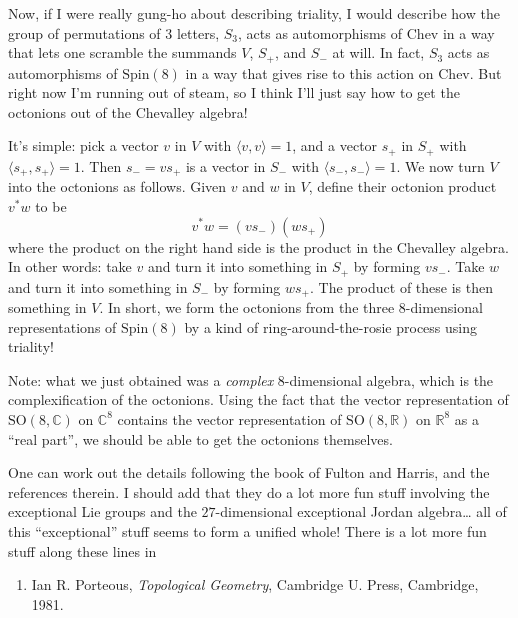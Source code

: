 \documentclass{article}
\def\tightlist{}
\begin{document}
Now, if I were really gung-ho about describing triality, I would
describe how the group of permutations of 3 letters, \(S_3\), acts as
automorphisms of \(\mathrm{Chev}\) in a way that lets one scramble the
summands \(V\), \(S_+\), and \(S_-\) at will. In fact, \(S_3\) acts as
automorphisms of \(\mathrm{Spin}(8)\) in a way that gives rise to this
action on \(\mathrm{Chev}\). But right now I'm running out of steam, so
I think I'll just say how to get the octonions out of the Chevalley
algebra!

It's simple: pick a vector \(v\) in \(V\) with
\(\langle v,v \rangle = 1\), and a vector \(s_+\) in \(S_+\) with
\(\langle s_+,s_+ \rangle = 1\). Then \(s_- = vs_+\) is a vector in
\(S_-\) with \(\langle s_-,s_- \rangle = 1\). We now turn \(V\) into the
octonions as follows. Given \(v\) and \(w\) in \(V\), define their
octonion product \(v^*w\) to be \[v^*w = (v s_-) (w s_+)\] where the
product on the right hand side is the product in the Chevalley algebra.
In other words: take \(v\) and turn it into something in \(S_+\) by
forming \(v s_-\). Take \(w\) and turn it into something in \(S_-\) by
forming \(w s_+\). The product of these is then something in \(V\). In
short, we form the octonions from the three \(8\)-dimensional
representations of \(\mathrm{Spin}(8)\) by a kind of
ring-around-the-rosie process using triality!

Note: what we just obtained was a \emph{complex} \(8\)-dimensional
algebra, which is the complexification of the octonions. Using the fact
that the vector representation of \(\mathrm{SO}(8,\mathbb{C})\) on
\(\mathbb{C}^8\) contains the vector representation of
\(\mathrm{SO}(8,\mathbb{R})\) on \(\mathbb{R}^8\) as a ``real part'', we
should be able to get the octonions themselves.

One can work out the details following the book of Fulton and Harris,
and the references therein. I should add that they do a lot more fun
stuff involving the exceptional Lie groups and the \(27\)-dimensional
exceptional Jordan algebra\ldots{} all of this ``exceptional'' stuff
seems to form a unified whole! There is a lot more fun stuff along these
lines in

\begin{enumerate}
\def\labelenumi{\arabic{enumi})}
\setcounter{enumi}{2}
\tightlist
\item
  Ian R. Porteous, \emph{Topological Geometry}, Cambridge U. Press,
  Cambridge, 1981.
\end{enumerate}
\end{document}
